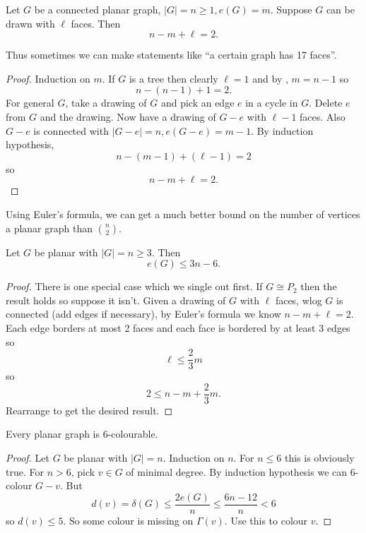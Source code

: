 \documentclass[a4paper]{article}
\begin{document}
\begin{theorem}
  Let \(G\) be a connected planar graph, \(|G| = n \geq 1, e(G) = m\). Suppose \(G\) can be drawn with \(\ell\) faces. Then
  \[
    n - m + \ell = 2.
  \]
\end{theorem}

Thus sometimes we can make statements like ``a certain graph has 17 faces''.

\begin{proof}
  Induction on \(m\). If \(G\) is a tree then clearly \(\ell = 1\) and by , \(m = n - 1\) so
  \[
    n - (n - 1) + 1 = 2.
  \]
  For general \(G\), take a drawing of \(G\) and pick an edge \(e\) in a cycle in \(G\). Delete \(e\) from \(G\) and the drawing. Now have a drawing of \(G - e\) with \(\ell - 1\) faces. Also \(G - e\) is connected with \(|G - e| = n, e(G - e) = m - 1\). By induction hypothesis,
  \[
    n - (m - 1) + (\ell - 1) = 2
  \]
  so
  \[
    n - m + \ell = 2.
  \]
\end{proof}

Using Euler's formula, we can get a much better bound on the number of vertices a planar graph than \(\binom{n}{2}\).

\begin{theorem}
  Let \(G\) be planar with \(|G| = n \geq 3\). Then
  \[
    e(G) \leq 3n - 6.
  \]
\end{theorem}

\begin{proof}
  There is one special case which we single out first. If \(G \cong P_2\) then the result holds so suppose it isn't. Given a drawing of \(G\) with \(\ell\) faces, wlog \(G\) is connected (add edges if necessary), by Euler's formula we know \(n - m + \ell = 2\). Each edge borders at most 2 faces and each face is bordered by at least 3 edges so
  \[
    \ell \leq \frac{2}{3} m
  \]
  so
  \[
    2 \leq n - m + \frac{2}{3} m.
  \]
  Rearrange to get the desired result.
\end{proof}

\begin{proposition}
  Every planar graph is 6-colourable.
\end{proposition}

\begin{proof}
  Let \(G\) be planar with \(|G| = n\). Induction on \(n\). For \(n \leq 6\) this is obviously true. For \(n > 6\), pick \(v \in G\) of minimal degree. By induction hypothesis we can 6-colour \(G - v\). But
  \[
    d(v) = \delta(G) \leq \frac{2 e(G)}{n} \leq \frac{6n - 12}{n} < 6
  \]
  so \(d(v) \leq 5\). So some colour is missing on \(\Gamma(v)\). Use this to colour \(v\).
\end{proof}
\end{document}

